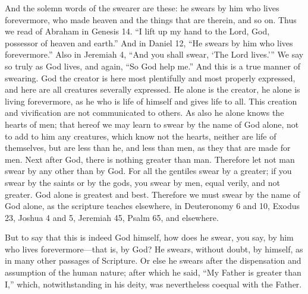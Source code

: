 And the solemn words of the swearer are these: he swears by him who lives forevermore, who made heaven and the things that are therein, and so on. Thus we read of Abraham in Genesis 14. “I lift up my hand to the Lord, God, possessor of heaven and earth.” And in Daniel 12, “He swears by him who lives forevermore.” Also in Jeremiah 4, “And you shall swear, ‘The Lord lives.’” We say so truly as God lives, and again, “So God help me.” And this is a true manner of swearing. God the creator is here most plentifully and most properly expressed, and here are all creatures severally expressed. He alone is the creator, he alone is living forevermore, as he who is life of himself and gives life to all. This creation and vivification are not communicated to others. As also he alone knows the hearts of men; that hereof we may learn to swear by the name of God alone, not to add to him any creatures, which know not the hearts, neither are life of themselves, but are less than he, and less than men, as they that are made for men. Next after God, there is nothing greater than man. Therefore let not man swear by any other than by God. For all the gentiles swear by a greater; if you swear by the saints or by the gods, you swear by men, equal verily, and not greater. God alone is greatest and best. Therefore we must swear by the name of God alone, as the scripture teaches elsewhere, in Deuteronomy 6 and 10, Exodus 23, Joshua 4 and 5, Jeremiah 45, Psalm 65, and elsewhere.

But to say that this is indeed God himself, how does he swear, you say, by him who lives forevermore—that is, by God? He swears, without doubt, by himself, as in many other passages of Scripture. Or else he swears after the dispensation and assumption of the human nature; after which he said, “My Father is greater than I,” which, notwithstanding in his deity, was nevertheless coequal with the Father.

